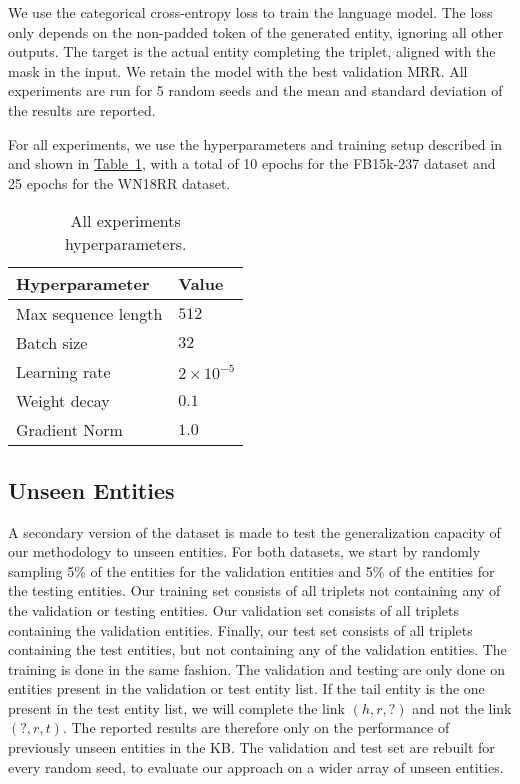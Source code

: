 \documentclass[11pt,a4paper]{article}
\newcommand{\CiteT}[1]{\citet{#1}} \newcommand{\CiteP}[1]{~\citep{#1}} \newcommand{\CodeT}[1]{\texttt{#1}}
\newcommand{\RefTable}[1]{\hyperref[#1]{Table~\ref{#1}}}
\newcommand{\Table}[3]{\begin{table}[H]
\begin{center}
  \caption{#3}
  \vspace{-0.25\baselineskip}
  \label{#2}
  #1
\end{center}
\end{table}}
\begin{document}
We use the categorical cross-entropy loss to train the language model.
The loss only depends on the non-padded token of the generated entity, ignoring all other outputs.
The target is the actual entity completing the triplet, aligned with the mask in the input.
We retain the model with the best validation MRR.
All experiments are run for 5 random seeds and the mean and standard deviation of the results are reported.

For all experiments, we use the hyperparameters and training setup described in \CiteT{RoBERTa} and shown in \RefTable{tab:hparams}, with a total of 10 epochs for the FB15k-237 dataset and 25 epochs for the WN18RR dataset.

\Table{\begin{tabular}{m{}l}
    \toprule
    Hyperparameter & Value\\
    \midrule
    Max sequence length & $512$\\
    Batch size & $32$\\
    Learning rate & $2 \times 10^{-5}$\\
    Weight decay & $0.1$\\
    Gradient Norm & $1.0$\\
    \bottomrule
  \end{tabular}}
{tab:hparams}
{All experiments hyperparameters.}



\subsection{Unseen Entities}

A secondary version of the dataset is made to test the generalization capacity of our methodology to unseen entities.
For both datasets, we start by randomly sampling 5\% of the entities for the validation entities and 5\% of the entities for the testing entities.
Our training set consists of all triplets not containing any of the validation or testing entities.
Our validation set consists of all triplets containing the validation entities.
Finally, our test set consists of all triplets containing the test entities, but not containing any of the validation entities.
The training is done in the same fashion.
The validation and testing are only done on entities present in the validation or test entity list.
If the tail entity is the one present in the test entity list, we will complete the link $(h, r, ?)$ and not the link $(?, r, t)$.
The reported results are therefore only on the performance of previously unseen entities in the KB.
The validation and test set are rebuilt for every random seed, to evaluate our approach on a wider array of unseen entities.
\end{document}
